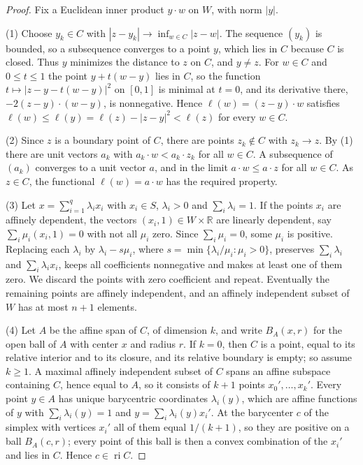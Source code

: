 \begin{proof}
Fix a Euclidean inner product $y\cdot w$ on $W$, with norm $|y|$.

(1) Choose $y_k\in C$ with $|z-y_k|\to\inf_{w\in C}|z-w|$. The sequence $(y_k)$ is bounded, so a subsequence converges to a point $y$, which lies in $C$ because $C$ is closed. Thus $y$ minimizes the distance to $z$ on $C$, and $y\neq z$. For $w\in C$ and $0\leq t\leq1$ the point $y+t(w-y)$ lies in $C$, so the function $t\mapsto|z-y-t(w-y)|^2$ on $[0,1]$ is minimal at $t=0$, and its derivative there, $-2(z-y)\cdot(w-y)$, is nonnegative. Hence $\ell(w)=(z-y)\cdot w$ satisfies $\ell(w)\leq\ell(y)=\ell(z)-|z-y|^2<\ell(z)$ for every $w\in C$.

(2) Since $z$ is a boundary point of $C$, there are points $z_k\notin C$ with $z_k\to z$. By (1) there are unit vectors $a_k$ with $a_k\cdot w<a_k\cdot z_k$ for all $w\in C$. A subsequence of $(a_k)$ converges to a unit vector $a$, and in the limit $a\cdot w\leq a\cdot z$ for all $w\in C$. As $z\in C$, the functional $\ell(w)=a\cdot w$ has the required property.

(3) Let $x=\sum_{i=1}^q\lambda_ix_i$ with $x_i\in S$, $\lambda_i>0$ and $\sum_i\lambda_i=1$. If the points $x_i$ are affinely dependent, the vectors $(x_i,1)\in W\times\mathbb R$ are linearly dependent, say $\sum_i\mu_i(x_i,1)=0$ with not all $\mu_i$ zero. Since $\sum_i\mu_i=0$, some $\mu_i$ is positive. Replacing each $\lambda_i$ by $\lambda_i-s\mu_i$, where $s=\min\{\lambda_i/\mu_i:\mu_i>0\}$, preserves $\sum_i\lambda_i$ and $\sum_i\lambda_ix_i$, keeps all coefficients nonnegative and makes at least one of them zero. We discard the points with zero coefficient and repeat. Eventually the remaining points are affinely independent, and an affinely independent subset of $W$ has at most $n+1$ elements.

(4) Let $A$ be the affine span of $C$, of dimension $k$, and write $B_A(x,r)$ for the open ball of $A$ with center $x$ and radius $r$. If $k=0$, then $C$ is a point, equal to its relative interior and to its closure, and its relative boundary is empty; so assume $k\geq1$. A maximal affinely independent subset of $C$ spans an affine subspace containing $C$, hence equal to $A$, so it consists of $k+1$ points $x_0',\ldots,x_k'$. Every point $y\in A$ has unique barycentric coordinates $\lambda_i(y)$, which are affine functions of $y$ with $\sum_i\lambda_i(y)=1$ and $y=\sum_i\lambda_i(y)x_i'$. At the barycenter $c$ of the simplex with vertices $x_i'$ all of them equal $1/(k+1)$, so they are positive on a ball $B_A(c,r)$; every point of this ball is then a convex combination of the $x_i'$ and lies in $C$. Hence $c\in\operatorname{ri}C$.


\end{proof}
